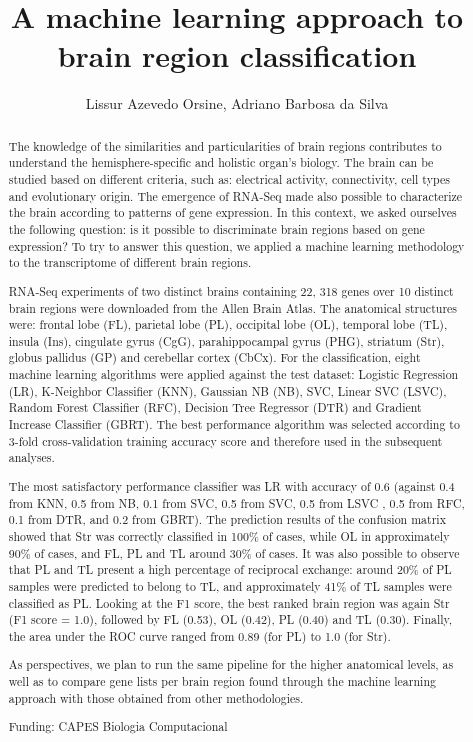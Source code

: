\documentclass[twoside]{article}
\title{\vspace{-15mm}\fontsize{24pt}{10pt}\selectfont\textbf{ A machine learning approach to brain region classification }} %
\author{ Lissur Azevedo Orsine, Adriano Barbosa da Silva }
\affil{ Laborat\'orio de Biodados,  Universidade Federal de Minas Gerais }
\date{}
\begin{document}
  
  
  \maketitle %
  
  
  \thispagestyle{fancy} %
  
  
  \begin{abstract}
  The knowledge of the similarities and particularities of brain regions contributes to understand the hemisphere-specific and holistic organ’s biology. The brain can be studied based on different criteria,  such as: electrical activity,  connectivity,  cell types and evolutionary origin. The emergence of RNA-Seq made also possible to characterize the brain according to patterns of gene expression. In this context,  we asked ourselves the following question: is it possible to discriminate brain regions based on gene expression? To try to answer this question,  we applied a machine learning methodology to the transcriptome of different brain regions.

RNA-Seq experiments of two distinct brains containing 22, 318 genes over 10 distinct brain regions were downloaded from the Allen Brain Atlas. The anatomical structures were: frontal lobe (FL),  parietal lobe (PL),  occipital lobe (OL),  temporal lobe (TL),  insula (Ins),  cingulate gyrus (CgG),  parahippocampal gyrus (PHG),  striatum (Str),  globus pallidus (GP) and cerebellar cortex (CbCx). For the classification,  eight machine learning algorithms were applied against the test dataset: Logistic Regression (LR),  K-Neighbor Classifier (KNN),  Gaussian NB (NB),  SVC,  Linear SVC (LSVC),  Random Forest Classifier (RFC),  Decision Tree Regressor (DTR) and Gradient Increase Classifier (GBRT). The best performance algorithm was selected according to 3-fold cross-validation training accuracy score and therefore used in the subsequent analyses.

The most satisfactory performance classifier was LR with accuracy of 0.6 (against 0.4 from KNN,  0.5 from NB,  0.1 from SVC,  0.5 from SVC,  0.5 from LSVC ,  0.5 from RFC,  0.1 from DTR,  and 0.2 from GBRT). The prediction results of the confusion matrix showed that Str was correctly classified in 100\% of cases,  while OL in approximately 90\% of cases,  and FL,  PL and TL around 30\% of cases. It was also possible to observe that PL and TL present a high percentage of reciprocal exchange: around 20\% of PL samples were predicted to belong to TL,  and approximately 41\% of TL samples were classified as PL. Looking at the F1 score,  the best ranked brain region was again Str (F1 score = 1.0),  followed by FL (0.53),  OL (0.42),  PL (0.40) and TL (0.30). Finally,  the area under the ROC curve ranged from 0.89 (for PL) to 1.0 (for Str).

As perspectives,  we plan to run the same pipeline for the higher anatomical levels,  as well as to compare gene lists per brain region found through the machine learning approach with those obtained from other methodologies.
  
  Funding: CAPES Biologia Computacional \\ 
  \end{abstract}
  
\end{document}
